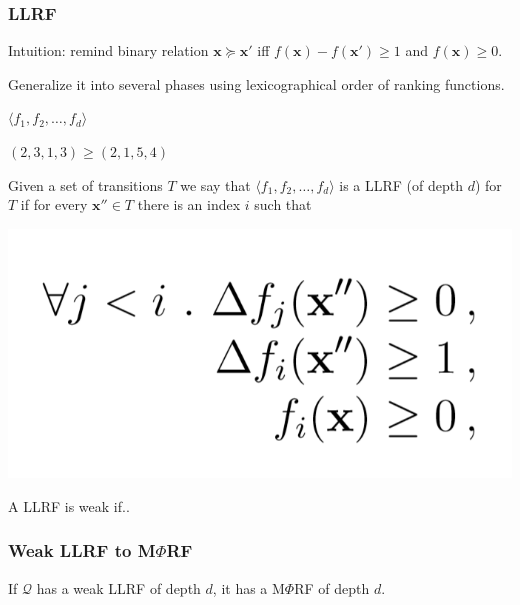 \documentclass[11pt]{beamer}
\newif\ifcomm\commfalse
\begin{document}
\iftrue
\begin{frame}\frametitle{LLRF}

Intuition: remind binary relation $\textbf{x} \succeq \textbf{x}'$ iff  $f(\textbf{x}) - f(\textbf{x}') \ge 1$ and $f(\textbf{x}) \ge 0$.

Generalize it into several phases using lexicographical order of ranking functions.

$\langle f_1, f_2, \ldots, f_d\rangle$

$(2,3,1,3) \ge (2,1,5,4)$

\begin{definition}[LLRF]
Given a set of transitions $T$ we say that 
$\langle f_1, f_2, \ldots, f_d\rangle$ is a LLRF (of depth $d$) for $T$ if for every $\textbf{x}''\in T$ there is an index $i$ such that 
\begin{center}
\includegraphics[scale = 0.26]{4.PNG}

\end{center}
A LLRF is weak if..
\end{definition}

\end{frame}
\begin{frame}\frametitle{Weak LLRF to M$\Phi$RF}

\begin{theorem}[3]
If $\mathcal{Q}$ has a weak LLRF of depth $d$, it has a  M$\Phi$RF of depth $d$.


\end{theorem}

\end{frame}
\ifcomm
\end{document}
